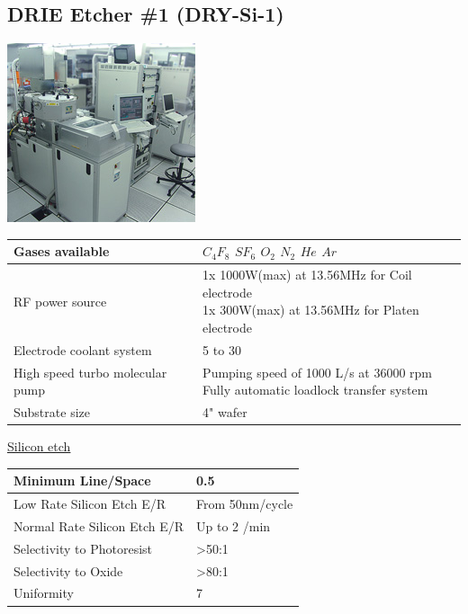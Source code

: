 \subsection{DRIE Etcher \#1 (DRY-Si-1)}\label{dry_DRIE_etcher}
\WaferClean

\begin{minipage}[H]{\MachinePictureMiniPageWidth}
	\includegraphics[width=\MachinePictureWidth]{pictures_machines/dry_DRIE.png}
\end{minipage}\begin{minipage}[H]{\MachineTextMiniPageWidth}
	\begin{tabular}{|p{3cm}|p{8cm}|}
		\hline
		Gases available
		&
		\makecell[l]{
			\tabitem $C_4 F_8$ \\
			\tabitem $S F_6$ \\
			\tabitem $O_2$ \\
			\tabitem $N_2$ \\
			\tabitem  $He$ \\
			\tabitem $Ar$
		} \\
		\hline
		RF power source
		&
		\makecell[l]{
			\tabitem 1x 1000W(max) at 13.56MHz for Coil electrode \\
			\tabitem 1x 300W(max) at 13.56MHz for Platen electrode
		} \\
		\hline
		Electrode coolant system
		&
		5 to 30 \degreesC \\
		\hline
		High speed turbo molecular pump
		&
		\makecell[l]{
			\tabitem Pumping speed of 1000 L/s at 36000 rpm \\
			\tabitem Fully automatic loadlock transfer system
		} \\
		\hline
		Substrate size
		&
		4" wafer \\
		\hline
	\end{tabular}

	\underline{Silicon etch}

	\begin{tabular}{|p{5cm}|p{6cm}|}
		\hline
		Minimum Line/Space
		&
		0.5 \um
		\\
		\hline
		Low Rate Silicon Etch E/R
		&
		From 50nm/cycle \\
		\hline
		Normal Rate Silicon Etch E/R
		&
		Up to 2 \um/min\\
		\hline
		Selectivity to Photoresist
		&
		>50:1 \\
		\hline
		Selectivity to Oxide
		&
		>80:1 \\
		\hline
		Uniformity
		&
		7\percent \\
		\hline
	\end{tabular}
\end{minipage}
